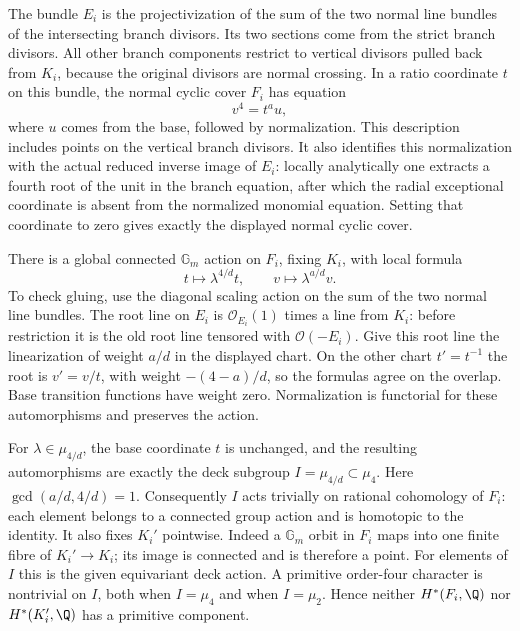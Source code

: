The bundle $E_i$ is the projectivization of the
sum of the two normal line bundles of the
intersecting branch divisors.  Its two sections
come from the strict branch divisors.  All other
branch components restrict to vertical divisors
pulled back from $K_i$, because the original
divisors are normal crossing.  In a ratio
coordinate $t$ on this bundle, the normal cyclic
cover $F_i$ has equation
\[
                       v^4=t^a u,
                                                        \tag{C32l}
\]
where $u$ comes from the base, followed by
normalization.  This description includes points
on the vertical branch divisors.  It also identifies
this normalization with the actual reduced inverse
image of $E_i$: locally analytically one extracts
a fourth root of the unit in the branch equation,
after which the radial exceptional coordinate is
absent from the normalized monomial equation.
Setting that coordinate to zero gives exactly
the displayed normal cyclic cover.

There is a global connected $\mathbb G_m$ action
on $F_i$, fixing $K_i$, with local formula
\[
              t\longmapsto\lambda^{4/d}t,
              \qquad v\longmapsto\lambda^{a/d}v.
                                                        \tag{C32m}
\]
To check gluing, use the diagonal scaling action
on the sum of the two normal line bundles.
The root line on $E_i$ is $\mathcal O_{E_i}(1)$
times a line from $K_i$: before restriction it
is the old root line tensored with
$\mathcal O(-E_i)$.  Give this root line the
linearization of weight $a/d$ in the displayed
chart.  On the other chart $t'=t^{-1}$ the
root is $v'=v/t$, with weight $-(4-a)/d$,
so the formulas agree on the overlap.  Base
transition functions have weight zero.
Normalization is functorial for these
automorphisms and preserves the action.

For $\lambda\in\mu_{4/d}$, the base coordinate
$t$ is unchanged, and the resulting automorphisms
are exactly the deck subgroup
$I=\mu_{4/d}\subset\mu_4$.  Here
$\gcd(a/d,4/d)=1$.  Consequently $I$ acts
trivially on rational cohomology of $F_i$:
each element belongs to a connected group
action and is homotopic to the identity.
It also fixes $K_i'$ pointwise.  Indeed a
$\mathbb G_m$ orbit in $F_i$ maps into one
finite fibre of $K_i'\to K_i$; its image is
connected and is therefore a point.  For
elements of $I$ this is the given equivariant
deck action.  A primitive order-four character
is nontrivial on $I$, both when $I=\mu_4$
and when $I=\mu_2$.  Hence neither
$H^*(F_i,\Q)$ nor $H^*(K_i',\Q)$ has a
primitive component.


